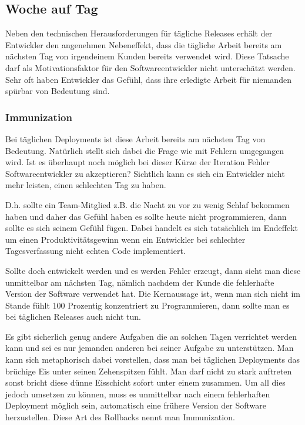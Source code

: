 \subsection{Woche auf Tag}
\label{subsec:subscription-modell}

Neben den technischen Herausforderungen für tägliche Releases erhält der
Entwickler den angenehmen Nebeneffekt, dass die tägliche Arbeit bereits am
nächsten Tag von irgendeinem Kunden bereits verwendet wird. Diese Tatsache
darf als Motivationsfaktor für den Softwareentwickler nicht unterschätzt
werden. Sehr oft haben Entwickler das Gefühl, dass ihre erledigte Arbeit für
niemanden spürbar von Bedeutung sind.

\subsubsection{Immunization}
Bei täglichen Deployments ist diese Arbeit bereits am nächsten Tag von
Bedeutung. Natürlich stellt sich dabei die Frage wie mit Fehlern umgegangen
wird. Ist es überhaupt noch möglich bei dieser Kürze der Iteration Fehler
Softwareentwickler zu akzeptieren? Sichtlich kann es sich ein Entwickler nicht
mehr leisten, einen schlechten Tag zu haben.

D.h. sollte ein Team-Mitglied z.B. die Nacht zu vor zu wenig Schlaf bekommen
haben und daher das Gefühl haben es sollte heute nicht programmieren, dann
sollte es sich seinem Gefühl fügen. Dabei handelt es sich tatsächlich im
Endeffekt um einen Produktivitätsgewinn wenn ein Entwickler bei schlechter
Tagesverfassung nicht echten Code implementiert.

Sollte doch entwickelt werden und es werden Fehler erzeugt, dann sieht man
diese unmittelbar am nächsten Tag, nämlich nachdem der Kunde die fehlerhafte
Version der Software verwendet hat. Die Kernaussage ist, wenn man sich nicht
im Stande fühlt 100 Prozentig konzentriert zu Programmieren, dann sollte man
es bei täglichen Releases auch nicht tun.

Es gibt sicherlich genug andere Aufgaben die an solchen Tagen verrichtet
werden kann und sei es nur jemanden anderen bei seiner Aufgabe zu
unterstützen. Man kann sich metaphorisch dabei vorstellen, dass man bei
täglichen Deployments das brüchige Eis unter seinen Zehenspitzen fühlt. Man
darf nicht zu stark auftreten sonst bricht diese dünne Eisschicht sofort unter
einem zusammen. Um all dies jedoch umsetzen zu können, muss es unmittelbar
nach einem fehlerhaften Deployment möglich sein, automatisch eine frühere
Version der Software herzustellen. Diese Art des Rollbacks nennt man
Immunization.


